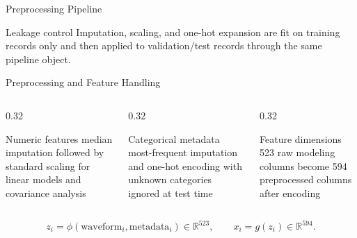 \documentclass[english, xcolor=dvipsnames, aspectratio=169]{beamer}
\begin{document}
\begin{frame}{Preprocessing Pipeline}
\begin{center}
\end{center}
\begin{block}{Leakage control}
Imputation, scaling, and one-hot expansion are fit on training records only and then applied to validation/test records through the same pipeline object.
\end{block}
\end{frame}

\begin{frame}{Preprocessing and Feature Handling}
\begin{columns}[T,totalwidth=\textwidth]
\begin{column}{0.32\textwidth}
\begin{block}{Numeric features}
\small median imputation followed by standard scaling for linear models and covariance analysis
\end{block}
\end{column}
\begin{column}{0.32\textwidth}
\begin{block}{Categorical metadata}
\small most-frequent imputation and one-hot encoding with unknown categories ignored at test time
\end{block}
\end{column}
\begin{column}{0.32\textwidth}
\begin{block}{Feature dimensions}
\small 523 raw modeling columns become 594 preprocessed columns after encoding
\end{block}
\end{column}
\end{columns}
\vspace{0.25cm}
\[
z_i=\phi(\text{waveform}_i,\text{metadata}_i)\in\mathbb{R}^{523},
\qquad
x_i=g(z_i)\in\mathbb{R}^{594}.
\]
\end{frame}
\end{document}
